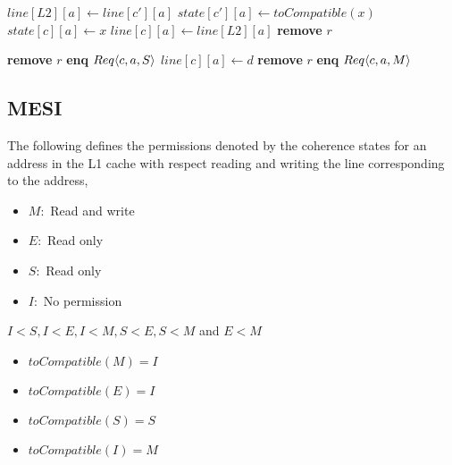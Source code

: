 \begin{algorithmic}
       \State $line[L2][a] \gets line[c'][a]$
    \EndIf
    \State $state[c'][a] \gets toCompatible(x)$
  \EndFor
  \State $state[c][a] \gets x$
    \State $line[c][a] \gets line[L2][a]$
  \EndIf
  \State \textbf{remove} $r$
\EndIf

      \State \textbf{remove} $r$
    \Else
      \State \textbf{enq} $\text{$Req\langle c,a,S\rangle$}$
    \EndIf
      \State $line[c][a] \gets d$
      \State \textbf{remove} $r$
    \Else
      \State \textbf{enq} $\text{$Req\langle c,a,M\rangle$}$
    \EndIf
  \EndIf
\EndIf
\end{algorithmic}

\subsection{MESI}

The following defines the permissions denoted by the coherence states for an
address in the L1 cache with respect reading and writing the line corresponding
to the address,

\begin{itemize}
\item $M:$ Read and write
\item $E:$ Read only
\item $S:$ Read only
\item $I:$ No permission
\end{itemize}

$I < S, I < E, I < M, S < E, S < M$ and $E < M$

\begin{itemize}
\item $toCompatible(M) = I$
\item $toCompatible(E) = I$
\item $toCompatible(S) = S$
\item $toCompatible(I) = M$
\end{itemize}

